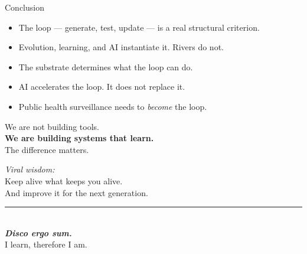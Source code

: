 \documentclass[aspectratio=169, 10pt]{beamer}
\begin{document}
\begin{frame}{Conclusion}
  \begin{itemize}
    \item The loop — generate, test, update — is a real structural criterion.
    \item Evolution, learning, and AI instantiate it. Rivers do not.
    \item The substrate determines what the loop can do.
    \item AI accelerates the loop. It does not replace it.
    \item Public health surveillance needs to \textit{become} the loop.
  \end{itemize}

  \bigskip
  \begin{alertblock}{}
    \centering
    We are not building tools.\\
    \textbf{We are building systems that learn.}\\[0.3em]
    The difference matters.
  \end{alertblock}
\end{frame}

\begin{frame}[plain]
  \begin{center}
    \vspace{1.2cm}
    {\large\textit{Viral wisdom:}}\\[0.8em]
    {\Large Keep alive what keeps you alive.}\\[0.4em]
    {\normalsize And improve it for the next generation.}\\[1.8em]
    \rule{0.55\textwidth}{0.4pt}\\[1em]
    {\LARGE\textbf{\textit{Disco ergo sum.}}}\\[0.3em]
    {\normalsize I learn, therefore I am.}
  \end{center}
\end{frame}
\end{document}
